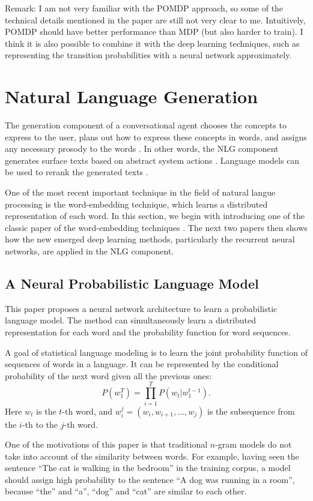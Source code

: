 \documentclass[paper=a4, fontsize=18pt]{article} %
\numberwithin{equation}{section} %
\numberwithin{figure}{section} %
\numberwithin{table}{section} %
\begin{document}
Remark: I am not very familiar with the POMDP approach, so some of the technical details mentioned in the paper are still not very clear to me. Intuitively, POMDP should have better performance than MDP (but also harder to train). I think it is also possible to combine it with the deep learning techniques, such as representing the transition probabilities with a neural network approximately.

\section{Natural Language Generation}

The generation component of a conversational agent chooses the concepts to express to the user, plans out how to express these concepts in words, and assigns any necessary prosody to the words \cite{Jurafsky2006}. In other words, the NLG component generates surface texts based on abstract system actions \cite{Wen2015Stochastic}. Language models can be used to rerank the generated texts \cite{Martens2011, Bengio2003A}.

One of the most recent important technique in the field of natural langue processing is the word-embedding technique, which learns a distributed representation of each word. In this section, we begin with introducing one of the classic paper of the word-embedding techniques \cite{Bengio2003A}. The next two papers then shows how the new emerged deep learning methods, particularly the recurrent neural networks, are applied in the NLG component.

\subsection{A Neural Probabilistic Language Model \cite{Bengio2003A}}

This paper proposes a neural network architecture to learn a probabilistic language model. The method can simultaneously learn a distributed representation for each word and the probability function for word sequences.

A goal of statistical language modeling is to learn the joint probability function of sequences of words in a language. It can be represented by the conditional probability of the next word given all the previous ones:
$$P(w_1^T) = \prod_{i=1}^T P(w_t | w_1^{t-1}).$$
Here $w_t$ is  the $t$-th word, and $w_i^j = (w_i, w_{i+1},... , w_j)$ is the subsequence from the $i$-th to the $j$-th word.

One of the motivations of this paper is that traditional $n$-gram models do not take into account of the similarity between words. For example, having seen the sentence ``The cat is walking in the bedroom'' in the training corpus, a model should assign high probability to the sentence ``A dog was running in a room'', because ``the'' and ``a'', ``dog'' and ``cat'' are similar to each other.
\end{document}
